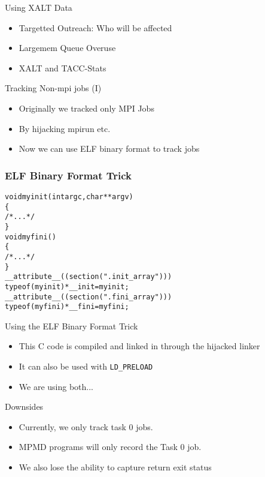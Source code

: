 \documentclass{beamer}
\begin{document}
\begin{frame}{Using XALT Data}
  \begin{itemize}
    \item Targetted Outreach: Who will be affected
    \item Largemem Queue Overuse
    \item XALT and TACC-Stats
  \end{itemize}
\end{frame}

\begin{frame}{Tracking Non-mpi jobs (I)}
  \begin{itemize}
    \item Originally we tracked only MPI Jobs
    \item By hijacking mpirun etc.
    \item Now we can use ELF binary format to track jobs
  \end{itemize}
\end{frame}

\begin{frame}[fragile]
    \frametitle{ELF Binary Format Trick}
 {\small
    \begin{alltt}
void myinit(int argc, char **argv)
\{
  /* ... */
\}
void myfini()
\{
  /* ... */
\}
  __attribute__((section(".init_array")))
       typeof(myinit) *__init = myinit;
  __attribute__((section(".fini_array")))
       typeof(myfini) *__fini = myfini;
    \end{alltt}
}
\end{frame}

\begin{frame}{Using the ELF Binary Format Trick}
  \begin{itemize}
    \item This C code is compiled and linked in through the hijacked linker
    \item It can also be used with \texttt{LD\_PRELOAD}
    \item We are using both...
  \end{itemize}
\end{frame}

\begin{frame}{Downsides}
  \begin{itemize}
    \item Currently, we only track task 0 jobs.
    \item MPMD programs will only record the Task 0 job.
    \item We also lose the ability to capture return exit status
  \end{itemize}
\end{frame}
\end{document}
